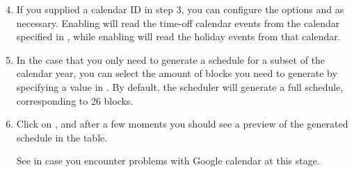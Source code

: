 \documentclass[letterpaper,10pt,english]{sphinxmanual}
\begin{document}
\begin{figure}[H]
\centering
{}\end{figure}
\begin{enumerate}
\setcounter{enumi}{3}
\item {} 
 If you supplied a calendar ID in step 3, you can configure
the options  and  as necessary.
Enabling  will read the time-off calendar events
from the calendar specified in , while enabling
 will read the holiday events from that calendar.

\end{enumerate}

\begin{figure}[H]
\centering
{}\end{figure}
\begin{enumerate}
\setcounter{enumi}{4}
\item {} 
 In the case that you only need to generate a schedule for
a subset of the calendar year, you can select the amount of blocks you need
to generate by specifying a value in . By default, the
scheduler will generate a full schedule, corresponding to 26 blocks.

\end{enumerate}

\begin{figure}[H]
\centering
{}\end{figure}
\begin{enumerate}
\setcounter{enumi}{5}
\item {} 
Click on , and after a few moments you should see a preview of
the generated schedule in the table.

 See  in case you encounter problems
with Google calendar at this stage.

\end{enumerate}
\end{document}
